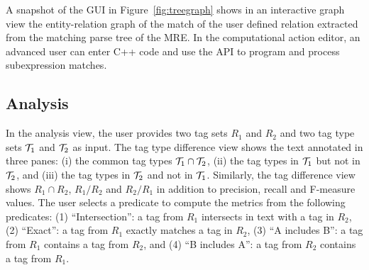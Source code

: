 A snapshot of the GUI in 
Figure~\ref{fig:treegraph} shows in an interactive graph view
the entity-relation graph of the match of the user defined relation 
extracted from the matching parse tree of the MRE. 
%
In the computational action editor, an advanced user can 
enter C++ code and use the \framework API to program and process 
subexpression matches. 

\subsection{Analysis}

In the analysis view, the user provides 
two tag sets $R_1$ and $R_2$ and 
two tag type sets ${\cal T}_1$ and ${\cal T}_2$ as input. 
%
The tag type difference view shows the text annotated in three panes: 
(i) the common tag types ${\cal T}_1 \cap {\cal T}_2$,
(ii) the tag types in ${\cal T}_1$ but not in ${\cal T}_2$, 
and (iii) the tag types in ${\cal T}_2$ and not in ${\cal T}_1$.
%
Similarly, the tag difference view shows $R_1\cap R_2$, $R_1/R_2$ and $R_2/R_1$
in addition to precision, recall and F-measure values. 
The user selects a predicate to compute the metrics from the following predicates:
(1) ``Intersection'': a tag from $R_1$ intersects in text with a tag in $R_2$,
(2) ``Exact'': a tag from $R_1$ exactly matches a tag in $R_2$,
(3) ``A includes B'': a tag from $R_1$ contains a tag from $R_2$, and
(4) ``B includes A'': a tag from $R_2$ contains a tag from $R_1$.
